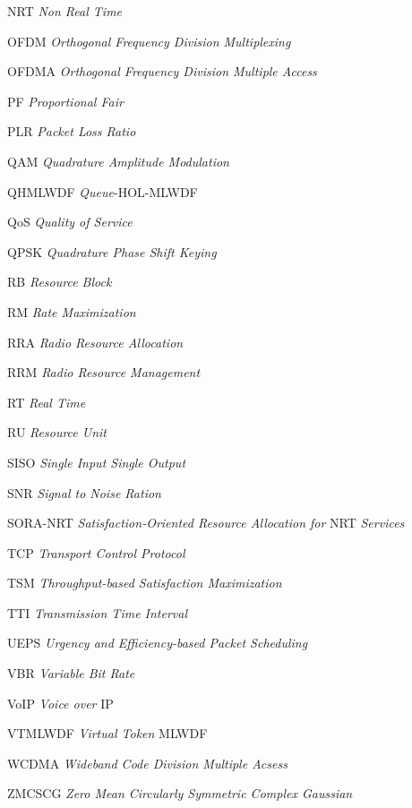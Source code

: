 \begin{siglas}
  \item[NRT] \textit{Non Real Time}
  
  \item[OFDM] \textit{Orthogonal Frequency Division Multiplexing}
  \item[OFDMA] \textit{Orthogonal Frequency Division Multiple Access}
  
  \item[PF] \textit{Proportional Fair}
  \item[PLR] \textit{Packet Loss Ratio}
  
  \item[QAM] \textit{Quadrature Amplitude Modulation}
  \item[QHMLWDF] \textit{Queue}-HOL-MLWDF
  \item[QoS] \textit{Quality of Service}
  \item[QPSK] \textit{Quadrature Phase Shift Keying}
  
  \item[RB] \textit{Resource Block}
  \item[RM] \textit{Rate Maximization}
  \item[RRA]\textit{Radio Resource Allocation}
  \item[RRM] \textit{Radio Resource Management}
  \item[RT] \textit{Real Time}
  \item[RU] \textit{Resource Unit}  
  
  \item[SISO] \textit{Single Input Single Output}  
  \item[SNR] \textit{Signal to Noise Ration}
  \item[SORA-NRT] \textit{Satisfaction-Oriented Resource Allocation for} NRT \textit{Services}
  
  \item[TCP] \textit{Transport Control Protocol}
  \item[TSM] \textit{Throughput-based Satisfaction Maximization}
  \item[TTI] \textit{Transmission Time Interval}
  
  \item[UEPS] \textit{Urgency and Efficiency-based Packet Scheduling}
  
  \item[VBR] \textit{Variable Bit Rate } 
  \item[VoIP] \textit{Voice over} IP
  \item[VTMLWDF] \textit{Virtual Token} MLWDF
    
  \item[WCDMA] \textit{Wideband Code Division Multiple Acsess} 
  
  \item[ZMCSCG] \textit{Zero Mean Circularly Symmetric Complex Gaussian}
   
\end{siglas}
